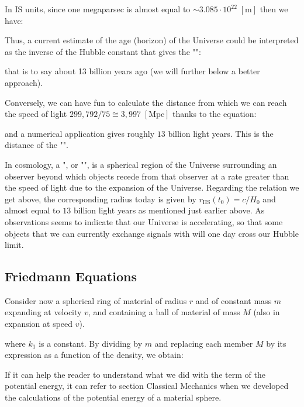 	In IS units, since one megaparsec is almost equal to $\sim 3.085\cdot 10^{22}\; [\text{m}]$ then we have:
	
	Thus, a current estimate of the age (horizon) of the Universe could be interpreted as the inverse of the Hubble constant that gives the "":
	
	that is to say about 13 billion years ago (we will further below a better approach).
	
	Conversely, we can have fun to calculate the distance from which we can reach the speed of light $299,792/75\cong 3,997\;[\text{Mpc}]$ thanks to the equation:
	
	and a numerical application gives roughly $13$ billion light years. This is the distance of the "".
	
	In cosmology, a ", or "", is a spherical region of the Universe surrounding an observer beyond which objects recede from that observer at a rate greater than the speed of light due to the expansion of the Universe. Regarding the relation we get above, the corresponding radius today is given by $r_{\text{HS}}(t_0)=c/H_0$ and almost equal to $13$ billion light years as mentioned just earlier above. As observations seems to indicate that our Universe is accelerating, so that some objects that we can currently exchange signals with will one day cross our Hubble limit.
	
	\subsection{Friedmann Equations}
	Consider now a spherical ring of material of radius $r$ and of constant mass $m$ expanding at velocity $v$, and containing a ball of material of mass $M$ (also in expansion at speed $v$).
	
	where $k_1$ is a constant. By dividing by $m$ and replacing each member $M$ by its expression as a function of the density, we obtain:
	
	\begin{tcolorbox}[title=Remark,colframe=black,arc=10pt]
	If it can help the reader to understand what we did with the term of the potential energy, it can refer to section Classical Mechanics when we developed the calculations of the potential energy of a material sphere.
	\end{tcolorbox}
	

